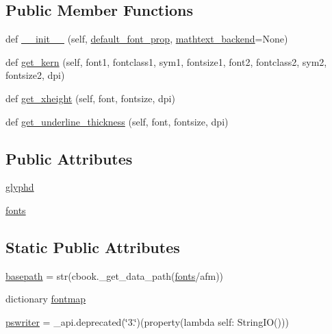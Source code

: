 \subsection*{Public Member Functions}
\begin{DoxyCompactItemize}
\item 
def \hyperlink{classmatplotlib_1_1__mathtext_1_1StandardPsFonts_a83e9136a04cc3246731ade36fd861d3c}{\+\_\+\+\_\+init\+\_\+\+\_\+} (self, \hyperlink{classmatplotlib_1_1__mathtext_1_1Fonts_a716114e691f32387590085aa0f7128ce}{default\+\_\+font\+\_\+prop}, \hyperlink{classmatplotlib_1_1__mathtext_1_1Fonts_a9742f1a6a11c8cf2ba8b0daddab0acec}{mathtext\+\_\+backend}=None)
\item 
def \hyperlink{classmatplotlib_1_1__mathtext_1_1StandardPsFonts_a412928aed334aea5dd621a557d0624ab}{get\+\_\+kern} (self, font1, fontclass1, sym1, fontsize1, font2, fontclass2, sym2, fontsize2, dpi)
\item 
def \hyperlink{classmatplotlib_1_1__mathtext_1_1StandardPsFonts_a73bb66f74852bf426a0f929fa024c11b}{get\+\_\+xheight} (self, font, fontsize, dpi)
\item 
def \hyperlink{classmatplotlib_1_1__mathtext_1_1StandardPsFonts_a770e8a99e21b18daf72767e7ce085332}{get\+\_\+underline\+\_\+thickness} (self, font, fontsize, dpi)
\end{DoxyCompactItemize}
\subsection*{Public Attributes}
\begin{DoxyCompactItemize}
\item 
\hyperlink{classmatplotlib_1_1__mathtext_1_1StandardPsFonts_a4bf41a4fc6438c15e860bebe57cbac6c}{glyphd}
\item 
\hyperlink{classmatplotlib_1_1__mathtext_1_1StandardPsFonts_ab6560162927ecd06600badce86bbd975}{fonts}
\end{DoxyCompactItemize}
\subsection*{Static Public Attributes}
\begin{DoxyCompactItemize}
\item 
\hyperlink{classmatplotlib_1_1__mathtext_1_1StandardPsFonts_a02f62031ce83ff9df0090bc73cfc63bd}{basepath} = str(cbook.\+\_\+get\+\_\+data\+\_\+path(\textquotesingle{}\hyperlink{classmatplotlib_1_1__mathtext_1_1StandardPsFonts_ab6560162927ecd06600badce86bbd975}{fonts}/afm\textquotesingle{}))
\item 
dictionary \hyperlink{classmatplotlib_1_1__mathtext_1_1StandardPsFonts_a2abf5b817b8699e7bc71b3e033085960}{fontmap}
\item 
\hyperlink{classmatplotlib_1_1__mathtext_1_1StandardPsFonts_ab2d33c19c995a2c5f4a4508487d49db5}{pswriter} = \+\_\+api.\+deprecated(\char`\"{}3.\char`\"{})(property(lambda self\+: String\+IO()))
\end{DoxyCompactItemize}


